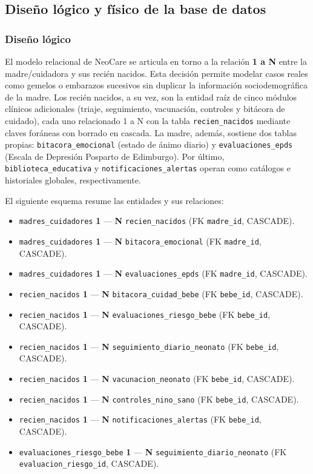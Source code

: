 \documentclass[12pt,letterpaper]{article}
\begin{document}
\subsection{Diseño lógico y físico de la base de datos}

\subsubsection{Diseño lógico}

El modelo relacional de NeoCare se articula en torno a la relación \textbf{1 a N} entre la madre/cuidadora y sus recién nacidos. Esta decisión permite modelar casos reales como gemelos o embarazos sucesivos sin duplicar la información sociodemográfica de la madre. Los recién nacidos, a su vez, son la entidad raíz de cinco módulos clínicos adicionales (triaje, seguimiento, vacunación, controles y bitácora de cuidado), cada uno relacionado 1 a N con la tabla \texttt{recien\_nacidos} mediante claves foráneas con borrado en cascada. La madre, además, sostiene dos tablas propias: \texttt{bitacora\_emocional} (estado de ánimo diario) y \texttt{evaluaciones\_epds} (Escala de Depresión Posparto de Edimburgo). Por último, \texttt{biblioteca\_educativa} y \texttt{notificaciones\_alertas} operan como catálogos e historiales globales, respectivamente.

El siguiente esquema resume las entidades y sus relaciones:

\begin{itemize}
    \item \texttt{madres\_cuidadores} \textbf{1} --- \textbf{N} \texttt{recien\_nacidos} (FK \texttt{madre\_id}, CASCADE).
    \item \texttt{madres\_cuidadores} \textbf{1} --- \textbf{N} \texttt{bitacora\_emocional} (FK \texttt{madre\_id}, CASCADE).
    \item \texttt{madres\_cuidadores} \textbf{1} --- \textbf{N} \texttt{evaluaciones\_epds} (FK \texttt{madre\_id}, CASCADE).
    \item \texttt{recien\_nacidos} \textbf{1} --- \textbf{N} \texttt{bitacora\_cuidad\_bebe} (FK \texttt{bebe\_id}, CASCADE).
    \item \texttt{recien\_nacidos} \textbf{1} --- \textbf{N} \texttt{evaluaciones\_riesgo\_bebe} (FK \texttt{bebe\_id}, CASCADE).
    \item \texttt{recien\_nacidos} \textbf{1} --- \textbf{N} \texttt{seguimiento\_diario\_neonato} (FK \texttt{bebe\_id}, CASCADE).
    \item \texttt{recien\_nacidos} \textbf{1} --- \textbf{N} \texttt{vacunacion\_neonato} (FK \texttt{bebe\_id}, CASCADE).
    \item \texttt{recien\_nacidos} \textbf{1} --- \textbf{N} \texttt{controles\_nino\_sano} (FK \texttt{bebe\_id}, CASCADE).
    \item \texttt{recien\_nacidos} \textbf{1} --- \textbf{N} \texttt{notificaciones\_alertas} (FK \texttt{bebe\_id}, CASCADE).
    \item \texttt{evaluaciones\_riesgo\_bebe} \textbf{1} --- \textbf{N} \texttt{seguimiento\_diario\_neonato} (FK \texttt{evaluacion\_riesgo\_id}, CASCADE).
\end{itemize}
\end{document}

